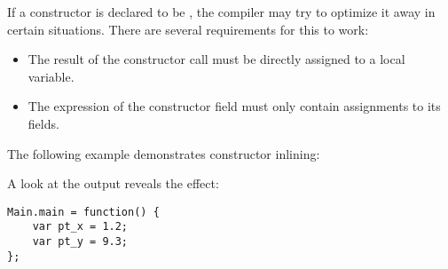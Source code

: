 If a constructor is declared to be , the compiler may try to optimize it away in certain situations. There are several requirements for this to work:

\begin{itemize}
	\item The result of the constructor call must be directly assigned to a local variable.
	\item The expression of the constructor field must only contain assignments to its fields.
\end{itemize}

The following example demonstrates constructor inlining:


A look at the  output reveals the effect:

\begin{lstlisting}
Main.main = function() {
	var pt_x = 1.2;
	var pt_y = 9.3;
};
\end{lstlisting}


%
%
%
%
%
%
